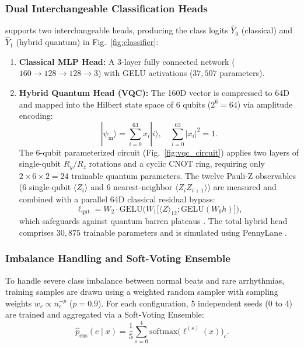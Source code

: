 \subsubsection{Dual Interchangeable Classification Heads}
\RRN{} supports two interchangeable heads, producing the class logits $\hat{Y}_0$ (classical) and $\hat{Y}_1$ (hybrid quantum) in Fig.~\ref{fig:classifier}:
\begin{enumerate}
    \item \textbf{Classical MLP Head:} A 3-layer fully connected network ($160 \to 128 \to 128 \to 3$) with GELU activations ($37{,}507$ parameters).
    \item \textbf{Hybrid Quantum Head (VQC):} The 160D vector is compressed to 64D and mapped into the Hilbert state space of 6 qubits ($2^6 = 64$) via amplitude encoding:
    \begin{equation}
    |\psi_{\mathrm{in}}\rangle = \sum_{i=0}^{63} x_i |i\rangle, \quad \sum_{i=0}^{63} |x_i|^2 = 1.
    \end{equation}
    The 6-qubit parameterized circuit (Fig.~\ref{fig:vqc_circuit}) applies two layers of single-qubit $R_y/R_z$ rotations and a cyclic CNOT ring, requiring only $2 \times 6 \times 2 = 24$ trainable quantum parameters. The twelve Pauli-Z observables ($6$ single-qubit $\langle Z_i \rangle$ and $6$ nearest-neighbor $\langle Z_i Z_{i+1} \rangle$) are measured and combined with a parallel 64D classical residual bypass:
    \begin{equation}
    \ell_{\mathrm{qnt}} = W_2 \cdot \mathrm{GELU}\Big(W_1 \big[\langle Z \rangle_{12}; \mathrm{GELU}(W_b h)\big]\Big),
    \end{equation}
    which safeguards against quantum barren plateaus \cite{mcclean2018}. The total hybrid head comprises $30{,}875$ trainable parameters and is simulated using PennyLane \cite{pennylane2018}.
\end{enumerate}

\subsubsection{Imbalance Handling and Soft-Voting Ensemble}
To handle severe class imbalance between normal beats and rare arrhythmias, training samples are drawn using a weighted random sampler with sampling weights $w_c \propto n_c^{-p}$ ($p=0.9$). For each configuration, 5 independent seeds (0 to 4) are trained and aggregated via a Soft-Voting Ensemble:
\begin{equation}
\hat{p}_{\mathrm{ens}}(c \mid x) = \frac{1}{5}\sum_{s=0}^4 \mathrm{softmax}\big(\ell^{(s)}(x)\big)_c.
\end{equation}
